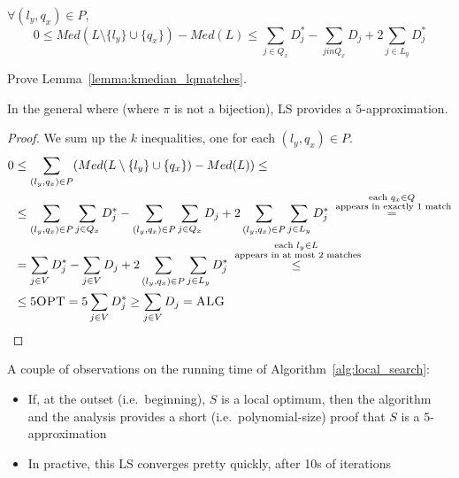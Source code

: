     \begin{lemma}\label{lemma:kmedian_lqmatches}
        $\forall (l_y, q_x) \in P$,
        \[ 0 \leq Med(L \setminus \{l_y\} \cup \{q_x\}) - Med(L) \leq \sum_{j \in Q_x} D_j^* - \sum_{j in Q_x} D_j + 2 \sum_{j \in L_y} D_j^* \]
    \end{lemma}

    \begin{exercise}
        Prove Lemma~\ref{lemma:kmedian_lqmatches}.
    \end{exercise}

    \begin{theorem}
        In the general where (where $\pi$ is not a bijection), LS provides a $5$-approximation.
    \end{theorem}

    \begin{proof}
        We sum up the $k$ inequalities, one for each $(l_y, q_x) \in P$.
        \begin{equation*}
            \begin{split}
                0 &\leq \sum_{(l_y, q_x) \in P} (Med(L \setminus \{l_y\} \cup \{q_x\}) - Med(L)) \leq\\
                &\leq \sum_{(l_y,q_x) \in P} \sum_{j \in Q_x} D_j^* - \sum_{(l_y,q_x) \in P} \sum_{j \in Q_x} D_j + 2 \sum_{(l_y,q_x) \in P} \sum_{j \in L_y} D_j^* \overset{\substack{\text{each } q_x \in Q\\\text{ appears in exactly 1 match}}}{=}\\
                &= \sum_{j \in V} D_j^* - \sum_{j \in V} D_j + 2 \sum_{(l_y,q_x) \in P} \sum_{j \in L_y} D_j^* \overset{\substack{\text{each } l_y \in L\\ \text{ appears in at most 2 matches}}}{\leq}\\
                &\leq 5 \textsc{OPT} = 5 \sum_{j \in V} D_j^* \geq \sum_{j \in V} D_j = \textsc{ALG}
            \end{split}
        \end{equation*}
    \end{proof}

    A couple of observations on the running time of Algorithm~\ref{alg:local_search}:
    \begin{itemize}
        \item If, at the outset (i.e.~beginning), $S$ is a local optimum, then the algorithm and the analysis provides a short (i.e.~polynomial-size) proof that $S$ is a $5$-approximation
        \item In practive, this LS converges pretty quickly, after 10s of iterations
    \end{itemize}

